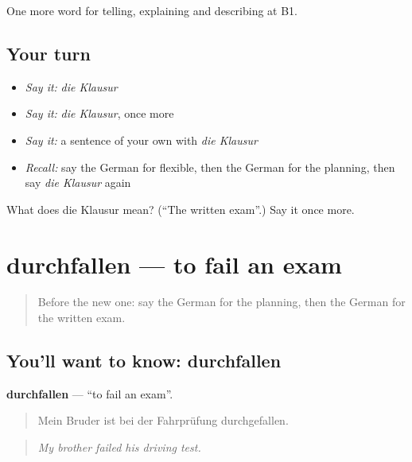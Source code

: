 \begin{grammarlens}[title={What you've built}]
One more word for telling, explaining and describing at B1.
\end{grammarlens}

\subsection*{Your turn}
\begin{itemize}
\raggedright
  \item \emph{Say it:} \emph{die Klausur}
  \item \emph{Say it:} \emph{die Klausur}, once more
  \item \emph{Say it:} a sentence of your own with \emph{die Klausur}
  \item \emph{Recall:} say the German for flexible, then the German for the planning, then say \emph{die Klausur} again
\end{itemize}

\begin{tcolorbox}[breakable,colback=teal!4,colframe=teal!35!black,title={Before you move on}]
What does die Klausur mean? (\textquotedblleft{}The written exam\textquotedblright{}.) Say it once more.
\end{tcolorbox}
\section[durchfallen]{durchfallen — to fail an exam}

\label{lesson:GE-C375-durchfallen}



\begin{quote}
Before the new one: say the German for the planning, then the German for the written exam.
\end{quote}

\subsection*{You'll want to know: durchfallen}
\textbf{durchfallen} — \textquotedblleft{}to fail an exam\textquotedblright{}.

\begin{quote}
Mein Bruder ist bei der Fahrprüfung durchgefallen.
\end{quote}

\begin{quote}
\emph{My brother failed his driving test.}
\end{quote}

